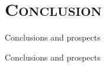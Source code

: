 \documentclass[xcolor=x11names,compress]{beamer}
\begin{document}
\section{\scshape Conclusion}

{
\begin{frame}[t]{Conclusions and prospects}
    
\end{frame}}

{
\begin{frame}[t]{Conclusions and prospects}
    
    
\end{frame}}
\end{document}
